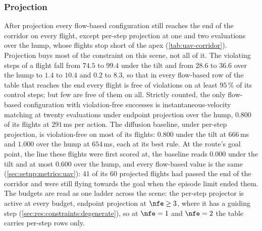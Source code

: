 \subsubsection{Projection}\label{sec:res:uav:projected}
After projection every flow-based configuration still reaches the end of the corridor on every flight,
except per-step projection at one and two evaluations over the hump, whose flights stop short of the apex
(\autoref{tab:uav-corridor}). Projection buys most of the constraint on this scene, not all of it. The
violating steps of a flight fall from $74.5$ to $99.4$ under the tilt and from
$28.6$ to $36.6$ over the hump to $1.4$ to $10.4$ and $0.2$ to $8.3$, so that in every flow-based row of
the table that reaches the end every flight is free of violations on at least $95\,\%$ of its control
steps; but few are free of them on all. Strictly counted, the only flow-based configuration with violation-free successes is
instantaneous-velocity matching at twenty evaluations under endpoint projection over the hump, $0.800$ of
its flights at $291$\,ms per action. The diffusion baseline, under per-step projection, is violation-free
on most of its flights: $0.800$ under the tilt at $666$\,ms and $1.000$ over the hump at $654$\,ms, each at
its best rule. At the route's goal point, the line these flights were first scored at, the baseline reads
$0.000$ under the tilt and at most $0.600$ over the hump, and every flow-based value is the same
(\autoref{sec:setup:metrics:uav}): $41$ of its $60$ projected flights had passed the end of the corridor and
were still flying towards the goal when the episode limit ended them. The budgets are read as one ladder
across the scene: the per-step projector is active at every budget, endpoint projection at $\nfe\ge 3$,
where it has a guiding step (\autoref{sec:res:constraints:degenerate}), so at $\nfe=1$ and $\nfe=2$ the
table carries per-step rows only.

